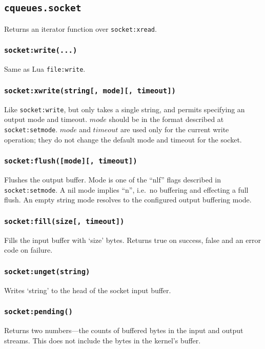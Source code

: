 \documentclass[11pt, oneside]{memoir}
\newcommand*{\fn}[1]{\texttt{#1}\xspace}
\newcommand*{\method}[1]{\texttt{#1}\xspace}
\newcounter{toccols}
\newenvironment{Module}[1]{
	\subsection{\texttt{#1}}
	\addtocontents{toc}{
		\protect\begin{multicols}{\value{toccols}}
	}
}{
	\addtocontents{toc}{\protect\end{multicols}}
}
\begin{document}
\begin{Module}{cqueues.socket}
Returns an iterator function over \method{socket:xread}.

\subsubsection[\fn{socket:write}]{\fn{socket:write(...)}}
Same as Lua \fn{file:write}.

\subsubsection[\fn{socket:xwrite}]{\fn{socket:xwrite(string[, mode][, timeout])}}

Like \method{socket:write}, but only takes a single string, and permits specifying an output mode and timeout. $mode$ should be in the format described at \method{socket:setmode}. $mode$ and $timeout$ are used only for the current write operation; they do not change the default mode and timeout for the socket.

\subsubsection[\fn{socket:flush}]{\fn{socket:flush([mode][, timeout])}}
Flushes the output buffer. Mode is one of the ``nlf'' flags described in \method{socket:setmode}. A nil mode implies ``n'', i.e.\ no buffering and effecting a full flush. An empty string mode resolves to the configured output buffering mode.

\subsubsection[\fn{socket:fill}]{\fn{socket:fill(size[, timeout])}}
Fills the input buffer with `size' bytes. Returns true on success, false and an error code on failure.

\subsubsection[{\fn{socket:unget}}]{\fn{socket:unget(string)}}
Writes `string' to the head of the socket input buffer.

\subsubsection[{\fn{socket:pending}}]{\fn{socket:pending()}}
Returns two numbers---the counts of buffered bytes in the input and output streams. This does not include the bytes in the kernel's buffer.


\end{Module}
\end{document}
